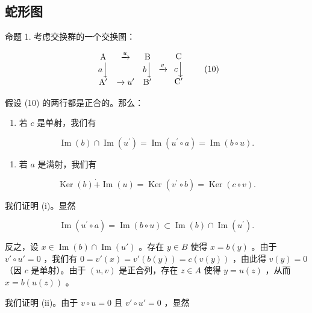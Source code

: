 \subsection{蛇形图}

命题 1. 考虑交换群的一个交换图：

\[
\begin{array}{c c c} \mathrm{A} & \xrightarrow {u} & \mathrm{B} \\ a \Big \downarrow & & b \Big \downarrow \\ \mathrm{A} ^ {\prime} & \xrightarrow {} u ^ {\prime} & \mathrm{B} ^ {\prime} \end{array} \xrightarrow {v} \begin{array}{c c c} \mathrm{C} \\ c \Big \downarrow \\ \mathrm{C} ^ {\prime} \end{array}\tag{10}
\]

假设 (10) 的两行都是正合的。那么：

\begin{enumerate}
\def\labelenumi{(\roman{enumi})}
\tightlist
\item
  若 \(c\) 是单射，我们有
\end{enumerate}

\[
\operatorname{Im} (b) \cap \operatorname{Im} (u ^ {\prime}) = \operatorname{Im} (u ^ {\prime} \circ a) = \operatorname{Im} (b \circ u).\tag{11}
\]

\begin{enumerate}
\def\labelenumi{(\roman{enumi})}
\setcounter{enumi}{1}
\tightlist
\item
  若 \(a\) 是满射，我们有
\end{enumerate}

\[
\operatorname{Ker} (b) \dot {+} \operatorname{Im} (u) = \operatorname{Ker} (v ^ {\prime} \circ b) = \operatorname{Ker} (c \circ v).\tag{12}
\]

我们证明 (i)。显然

\[
\operatorname{Im} (u ^ {\prime} \circ a) = \operatorname{Im} (b \circ u) \subset \operatorname{Im} (b) \cap \operatorname{Im} (u ^ {\prime}).
\]

反之，设 \(x \in \operatorname{Im}(b) \cap \operatorname{Im}(u')\) 。存在 \(y \in B\) 使得 \(x = b(y)\) 。由于 \(v' \circ u' = 0\) ，我们有 \(0 = v'(x) = v'(b(y)) = c(v(y))\) ，由此得 \(v(y) = 0\) （因 \(c\) 是单射）。由于 \((u, v)\) 是正合列，存在 \(z \in A\) 使得 \(y = u(z)\) ，从而 \(x = b(u(z))\) 。

我们证明 (ii)。由于 \(v \circ u = 0\) 且 \(v' \circ u' = 0\) ，显然

